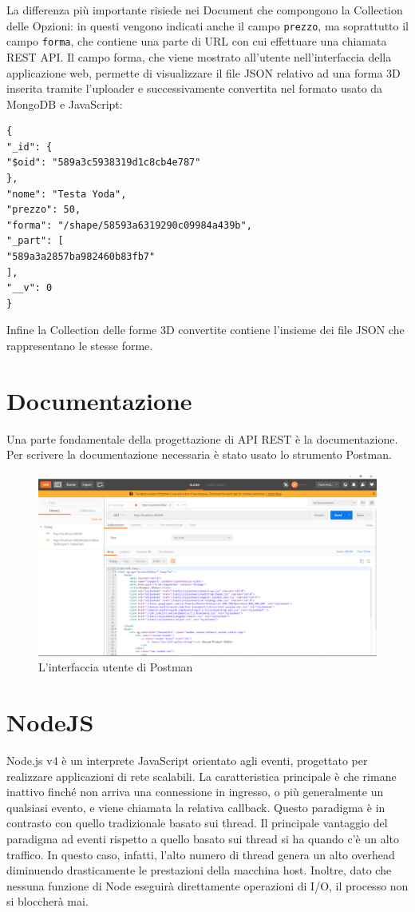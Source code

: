 La differenza più importante risiede nei Document che compongono la Collection delle Opzioni: in questi vengono indicati anche il campo \texttt{prezzo}, ma soprattutto il campo \texttt{forma}, che contiene una parte di URL con cui effettuare una chiamata REST API. Il campo forma, che viene mostrato all'utente nell'interfaccia della applicazione web, permette di visualizzare il file JSON relativo ad una forma 3D inserita tramite l'uploader e successivamente convertita nel formato usato da MongoDB e JavaScript:
\begin{lstlisting}[caption={Option Collection}, style=javaScriptCode]
{
"_id": {
"$oid": "589a3c5938319d1c8cb4e787"
},
"nome": "Testa Yoda",
"prezzo": 50,
"forma": "/shape/58593a6319290c09984a439b",
"_part": [
"589a3a2857ba982460b83fb7"
],
"__v": 0
}
\end{lstlisting}

Infine la Collection delle forme 3D convertite contiene l'insieme dei file JSON che rappresentano le stesse forme.

\section{Documentazione}
Una parte fondamentale della progettazione di API REST è la documentazione.
Per scrivere la documentazione necessaria è stato usato lo strumento Postman.
\begin{figure}[h]
	\centering
	\includegraphics[scale=0.35]{Immagini/postman_ui.png}
	\caption{L'interfaccia utente di Postman}
\end{figure}

\section{NodeJS}
Node.js\cite{node} v4 è un interprete JavaScript orientato agli eventi, progettato per realizzare applicazioni di rete scalabili.
La caratteristica principale è che rimane inattivo finché non arriva una connessione in ingresso, o più generalmente un qualsiasi evento, e viene chiamata la relativa callback.
Questo paradigma è in contrasto con quello tradizionale basato sui thread.
Il principale vantaggio del paradigma ad eventi rispetto a quello basato sui thread si ha quando c'è un alto traffico.
In questo caso, infatti, l'alto numero di thread genera un alto overhead diminuendo drasticamente le prestazioni della macchina host.
Inoltre, dato che nessuna funzione di Node eseguirà direttamente operazioni di I/O, il processo non si bloccherà mai.

